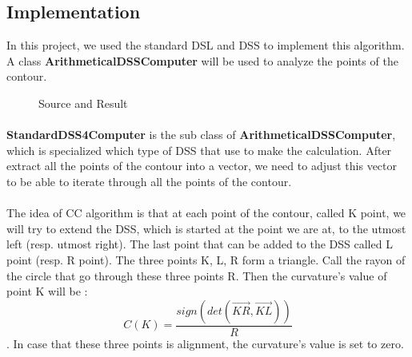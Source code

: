 \subsection{Implementation}\FloatBarrier
In this project, we used the standard DSL and DSS to implement this algorithm. A class \textbf{ArithmeticalDSSComputer} will be used to analyze the points of the contour.
\begin{figure}[h]
    \centering
    \qquad
    \caption{Source and Result}
    \label{fig:example}
\end{figure}
\paragraph{}
\textbf{StandardDSS4Computer} is the sub class of \textbf{ArithmeticalDSSComputer}, which is specialized which type of DSS that use to make the calculation. After extract all the points of the contour into a vector, we need to adjust this vector to be able to iterate through all the points of the contour. 

\paragraph{}
The idea of CC algorithm is that at each point of the contour, called K point, we will try to extend the DSS, which is started at the point we are at, to the utmost left (resp. utmost right). The last point that can be added to the DSS called L point (resp. R point). The three points K, L, R form a triangle. Call the rayon of the circle that go through these three points R. Then the curvature's value of point K will be :
$$
C(K) = \frac{sign(det(\overrightarrow{KR}, \overrightarrow{KL}))}{R}
$$.  
In case that these three points is alignment, the curvature's value is set to zero.


